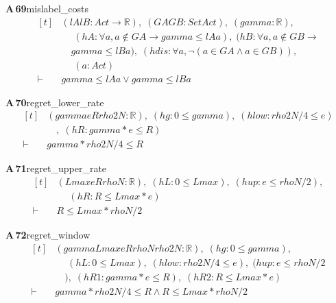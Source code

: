 \documentclass[conference]{IEEEtran}
\theoremstyle{definition}
\newcommand{\lean}[1]{\textsf{\footnotesize #1}}
\begin{document}
\noindent\textbf{A\,69}\quad\lean{mislabel\_costs}
{\footnotesize\[ \begin{aligned}[t]
&(\mathit{lA} \mathit{lB} : \mathit{Act} \to \mathbb{R} ),\; (\mathit{GA} \mathit{GB} : \mathit{Set} \mathit{Act}),\; (\mathit{gamma} : \mathbb{R} ),\\
&\quad \; (\mathit{hA} : \forall \mathit{a}, \mathit{a} \notin \mathit{GA} \to \mathit{gamma} \leq \mathit{lA} \mathit{a}),\; (\mathit{hB} : \forall \mathit{a}, \mathit{a} \notin \mathit{GB} \to\\
&\quad \mathit{gamma} \leq \mathit{lB} \mathit{a}),\; (\mathit{hdis} : \forall \mathit{a}, \neg (\mathit{a} \in \mathit{GA} \wedge \mathit{a} \in \mathit{GB})),\\
&\quad \; (\mathit{a} : \mathit{Act})\\
\vdash\;&\mathit{gamma} \leq \mathit{lA} \mathit{a} \vee \mathit{gamma} \leq \mathit{lB} \mathit{a}
\end{aligned} \]}

\noindent\textbf{A\,70}\quad\lean{regret\_lower\_rate}
{\footnotesize\[ \begin{aligned}[t]
&(\mathit{gamma} \mathit{e} \mathit{R} \mathit{rho2N} : \mathbb{R} ),\; (\mathit{hg} : 0 \leq \mathit{gamma}),\; (\mathit{hlow} : \mathit{rho2N}/4 \leq \mathit{e})\\
&\quad ,\; (\mathit{hR} : \mathit{gamma} * \mathit{e} \leq \mathit{R})\\
\vdash\;&\mathit{gamma} * \mathit{rho2N} / 4 \leq \mathit{R}
\end{aligned} \]}

\noindent\textbf{A\,71}\quad\lean{regret\_upper\_rate}
{\footnotesize\[ \begin{aligned}[t]
&(\mathit{Lmax} \mathit{e} \mathit{R} \mathit{rhoN} : \mathbb{R} ),\; (\mathit{hL} : 0 \leq \mathit{Lmax}),\; (\mathit{hup} : \mathit{e} \leq \mathit{rhoN}/2),\\
&\quad \; (\mathit{hR} : \mathit{R} \leq \mathit{Lmax} * \mathit{e})\\
\vdash\;&\mathit{R} \leq \mathit{Lmax} * \mathit{rhoN} / 2
\end{aligned} \]}

\noindent\textbf{A\,72}\quad\lean{regret\_window}
{\footnotesize\[ \begin{aligned}[t]
&(\mathit{gamma} \mathit{Lmax} \mathit{e} \mathit{R} \mathit{rhoN} \mathit{rho2N} : \mathbb{R} ),\; (\mathit{hg} : 0 \leq \mathit{gamma}),\\
&\quad \; (\mathit{hL} : 0 \leq \mathit{Lmax}),\; (\mathit{hlow} : \mathit{rho2N}/4 \leq \mathit{e}),\; (\mathit{hup} : \mathit{e} \leq \mathit{rhoN}/2\\
&\quad ),\; (\mathit{hR1} : \mathit{gamma} * \mathit{e} \leq \mathit{R}),\; (\mathit{hR2} : \mathit{R} \leq \mathit{Lmax} * \mathit{e})\\
\vdash\;&\mathit{gamma} * \mathit{rho2N} / 4 \leq \mathit{R} \wedge \mathit{R} \leq \mathit{Lmax} * \mathit{rhoN} / 2
\end{aligned} \]}
\end{document}
